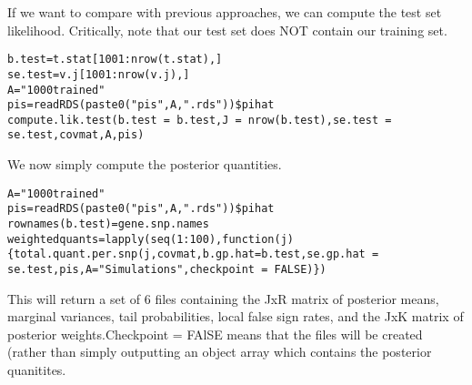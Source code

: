 \documentclass[10pt]{article}
\begin{document}
If we want to compare with previous approaches, we can compute the test set likelihood. Critically, note that our test set does NOT contain our training set.

\begin{verbatim}
b.test=t.stat[1001:nrow(t.stat),]
se.test=v.j[1001:nrow(v.j),]
A="1000trained"
pis=readRDS(paste0("pis",A,".rds"))$pihat
compute.lik.test(b.test = b.test,J = nrow(b.test),se.test = se.test,covmat,A,pis)
\end{verbatim}  

We now simply compute the posterior quantities. 

\begin{verbatim}
A="1000trained"
pis=readRDS(paste0("pis",A,".rds"))$pihat
rownames(b.test)=gene.snp.names
weightedquants=lapply(seq(1:100),function(j){total.quant.per.snp(j,covmat,b.gp.hat=b.test,se.gp.hat = se.test,pis,A="Simulations",checkpoint = FALSE)})
\end{verbatim}

This will return a set of 6 files containing the JxR matrix of posterior means, marginal variances, tail probabilities, local false sign rates, and the JxK matrix of posterior weights.Checkpoint = FAlSE means that the files will be created (rather than simply outputting an object array which contains the posterior quanitites.
\end{document}
